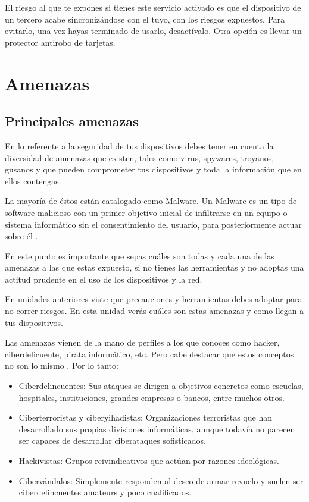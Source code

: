 \documentclass[
  a4paper,
  openany]{book}
\begin{document}
El riesgo al que te expones si tienes este servicio activado es que el dispositivo de un tercero acabe sincronizándose con el tuyo, con los riesgos expuestos. Para evitarlo, una vez hayas terminado de usarlo, desactívalo. Otra opción es llevar un protector antirobo de tarjetas.

\hypertarget{amenazas}{%
\chapter{Amenazas}\label{amenazas}}

\hypertarget{principales-amenazas}{%
\section{Principales amenazas}\label{principales-amenazas}}

En lo referente a la seguridad de tus dispositivos debes tener en cuenta la diversidad de amenazas que existen, tales como virus, spywares, troyanos, gusanos y que pueden comprometer tus dispositivos y toda la información que en ellos contengas.

La mayoría de éstos están catalogado como Malware. Un Malware es un tipo de software malicioso con un primer objetivo inicial de infiltrarse en un equipo o sistema informático sin el consentimiento del usuario, para posteriormente actuar sobre él \citep{WIKI-malware}.

En este punto es importante que sepas cuáles son todas y cada una de las amenazas a las que estas expuesto, si no tienes las herramientas y no adoptas una actitud prudente en el uso de los dispositivos y la red.

En unidades anteriores viste que precauciones y herramientas debes adoptar para no correr riesgos. En esta unidad verás cuáles son estas amenazas y como llegan a tus dispositivos.

Las amenazas vienen de la mano de perfiles a los que conoces como hacker, ciberdelicuente, pirata informático, etc. Pero cabe destacar que estos conceptos no son lo mismo \citep{OSPI-ciberseguridad-espana}. Por lo tanto:

\begin{itemize}
\item
  Ciberdelincuentes: Sus ataques se dirigen a objetivos concretos como escuelas, hospitales, instituciones, grandes empresas o bancos, entre muchos otros.
\item
  Ciberterroristas y ciberyihadistas: Organizaciones terroristas que han desarrollado sus propias divisiones informáticas, aunque todavía no parecen ser capaces de desarrollar ciberataques sofisticados.
\item
  Hackivistas: Grupos reivindicativos que actúan por razones ideológicas.
\item
  Cibervándalos: Simplemente responden al deseo de armar revuelo y suelen ser ciberdelincuentes amateurs y poco cualificados.
\end{itemize}
\end{document}

